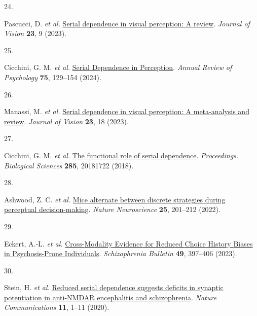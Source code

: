 \documentclass[
]{article}
\newlength{\cslhangindent}
\newlength{\csllabelwidth}
\newlength{\cslentryspacingunit} %
\newenvironment{CSLReferences}[2] %
 {%
  \setlength{\parindent}{0pt}
  \ifodd #1
  \let\oldpar\par
  \def\par{\hangindent=\cslhangindent\oldpar}
  \fi
  \setlength{\parskip}{#2\cslentryspacingunit}
 }%
 {}
\newcommand{\CSLLeftMargin}[1]{\parbox[t]{\csllabelwidth}{#1}}
\newcommand{\CSLRightInline}[1]{\parbox[t]{\linewidth - \csllabelwidth}{#1}\break}
\begin{document}
\begin{CSLReferences}{0}{0}
\leavevmode{}%
\CSLLeftMargin{24. }%
\CSLRightInline{Pascucci, D. \emph{et al.}
\href{https://doi.org/10.1167/jov.23.1.9}{Serial dependence in visual
perception: {A} review}. \emph{Journal of Vision} \textbf{23}, 9
(2023).}

\leavevmode{}%
\CSLLeftMargin{25. }%
\CSLRightInline{Cicchini, G. M. \emph{et al.}
\href{https://doi.org/10.1146/annurev-psych-021523-104939}{Serial
{Dependence} in {Perception}}. \emph{Annual Review of Psychology}
\textbf{75}, 129--154 (2024).}

\leavevmode{}%
\CSLLeftMargin{26. }%
\CSLRightInline{Manassi, M. \emph{et al.}
\href{https://doi.org/10.1167/jov.23.8.18}{Serial dependence in visual
perception: {A} meta-analysis and review}. \emph{Journal of Vision}
\textbf{23}, 18 (2023).}

\leavevmode{}%
\CSLLeftMargin{27. }%
\CSLRightInline{Cicchini, G. M. \emph{et al.}
\href{https://doi.org/10.1098/rspb.2018.1722}{The functional role of
serial dependence}. \emph{Proceedings. Biological Sciences}
\textbf{285}, 20181722 (2018).}

\leavevmode{}%
\CSLLeftMargin{28. }%
\CSLRightInline{Ashwood, Z. C. \emph{et al.}
\href{https://doi.org/10.1038/s41593-021-01007-z}{Mice alternate between
discrete strategies during perceptual decision-making}. \emph{Nature
Neuroscience} \textbf{25}, 201--212 (2022).}

\leavevmode{}%
\CSLLeftMargin{29. }%
\CSLRightInline{Eckert, A.-L. \emph{et al.}
\href{https://doi.org/10.1093/schbul/sbac168}{Cross-{Modality}
{Evidence} for {Reduced} {Choice} {History} {Biases} in
{Psychosis}-{Prone} {Individuals}}. \emph{Schizophrenia Bulletin}
\textbf{49}, 397--406 (2023).}

\leavevmode{}%
\CSLLeftMargin{30. }%
\CSLRightInline{Stein, H. \emph{et al.}
\href{https://doi.org/10.1038/s41467-020-18033-3}{Reduced serial
dependence suggests deficits in synaptic potentiation in anti-{NMDAR}
encephalitis and schizophrenia}. \emph{Nature Communications}
\textbf{11}, 1--11 (2020).}

\end{CSLReferences}
\end{document}

